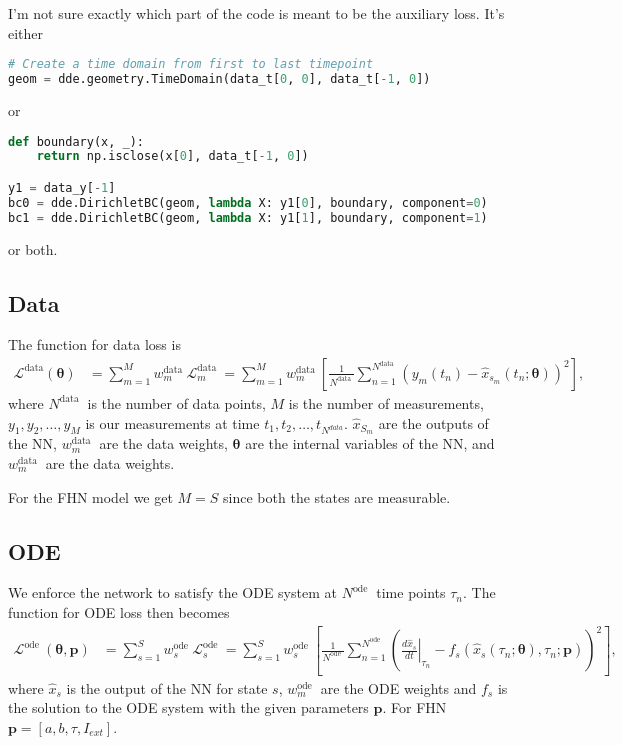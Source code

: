 \documentclass[a4paper]{article}
\begin{document}
I'm not sure exactly which part of the code is meant to be the auxiliary loss. It's either
\begin{lstlisting}[language=python]
# Create a time domain from first to last timepoint
geom = dde.geometry.TimeDomain(data_t[0, 0], data_t[-1, 0])
\end{lstlisting}
or
\begin{lstlisting}[language=python]
def boundary(x, _):
	return np.isclose(x[0], data_t[-1, 0])

y1 = data_y[-1]
bc0 = dde.DirichletBC(geom, lambda X: y1[0], boundary, component=0)
bc1 = dde.DirichletBC(geom, lambda X: y1[1], boundary, component=1)
\end{lstlisting}
or both. 



\subsection{Data}

The function for data loss is
\begin{align}
\mathcal{L}^{ \text{data}}(\boldsymbol{\theta}) &= \sum_{m=1}^{M} w_{m}^{\text {data }} \mathcal{L}_{m}^{\text {data }}=\sum_{m=1}^{M} w_{m}^{\text {data }}\left[\frac{1}{N^{\text {data }}} \sum_{n=1}^{N^{\text {data }}}\left(y_{m}\left(t_{n}\right)-\hat{x}_{s_{m}}\left(t_{n} ; \boldsymbol{\theta}\right)\right)^{2}\right],
\end{align}
where $N^{\text {data }}$ is the number of data points, $M$ is the number of measurements, $y_{1}, y_{2}, \ldots, y_{M}$ is our measurements at time $t_{1}, t_{2}, \ldots, t_{N^{d a t a}}$. $\hat{x}_{S_m}$ are the outputs of the NN, $w_{m}^{\text {data }}$ are the data weights, $\boldsymbol{\theta}$ are the internal variables of the NN, and $w_{m}^{\text {data }}$ are the data weights. 

For the FHN model we get $M=S$ since both the states are measurable. 






\subsection{ODE}

We enforce the network to satisfy the ODE system at $N^{\text {ode }}$ time points $\tau_{n}$.
The function for ODE loss then becomes 
\begin{align}
\mathcal{L}^{\text {ode }}(\boldsymbol{\theta}, \mathbf{p}) 
&= \sum_{s=1}^{S} w_{s}^{\text {ode }} \mathcal{L}_{s}^{\text {ode }}
= \sum_{s=1}^{S} w_{s}^{\text {ode }} \left[\frac{1}{N^{\text {ode }}} \sum_{n=1}^{N^{\text {ode }}}\left(\left. \frac{d \hat{x}_{s}}{d t}\right|_{\tau_{n}} - f_{s}\left(\hat{x}_{s}\left(\tau_{n} ; \boldsymbol{\theta}\right), \tau_{n} ; \mathbf{p}\right)\right)^{2}\right],
\end{align}
where $\hat{x}_{s}$ is the output of the NN for state $s$, $w_{m}^{\text {ode }}$ are the ODE weights and $f_s$ is the solution to the ODE system with the given parameters $\mathbf{p}$. For FHN $\mathbf{p} = [a, b, \tau, I_{ext}]$.
\end{document}
